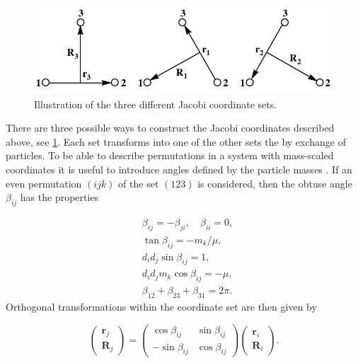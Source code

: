 \begin{figure}
	\includegraphics[width=\linewidth]{jacobii.pdf}
	\caption{Illustration of the three different Jacobi coordinate sets.}
	\label{fig:2}
\end{figure}

There are three possible ways to construct the Jacobi coordinates described above, see \cref{fig:2}. Each set transforms into one of the other sets the by exchange of particles. To be able to describe permutations in a system with mass-scaled coordinates it is useful to introduce angles defined by the particle masses \cite{Smith1962}. If an even permutation $(ijk)$ of the set $(123)$ is considered, then the obtuse angle $\beta_{ij}$ has the properties

\begin{subequations}
	\begin{align}
	&\beta_{ij} = -\beta_{ji}, \quad \beta_{ii} = 0,\\
	&\tan\beta_{ij} = -m_k/\mu,\\
	&d_{i}d_{j} \sin\beta_{ij} = 1,\\
	&d_{i}d_{j} m_{k} \cos\beta_{ij} = -\mu,\\
	&\beta_{12}+\beta_{23}+\beta_{31} = 2\pi.
	\end{align}
\end{subequations}
Orthogonal transformations within the coordinate set are then given by 

\begin{equation}
\begin{pmatrix}
\mathbf{r}_j\\
\mathbf{R}_j
\end{pmatrix}
=
\begin{pmatrix}
\cos\beta_{ij} & \sin\beta_{ij}\\
-\sin\beta_{ij} & \cos\beta_{ij}
\end{pmatrix}
\begin{pmatrix}
\mathbf{r}_i\\
\mathbf{R}_i
\end{pmatrix}.
\end{equation}

